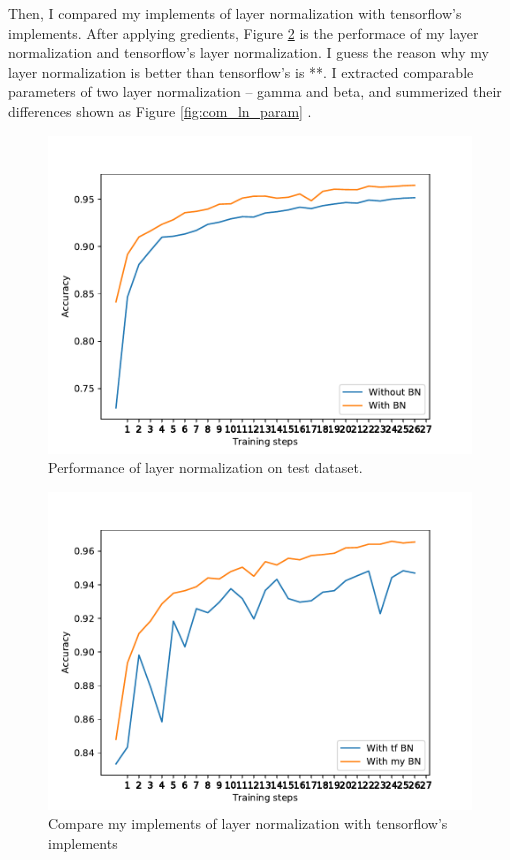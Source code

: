 \documentclass{article}
\begin{document}
Then, I compared my implements of layer normalization with tensorflow's implements. After applying gredients, Figure \ref{fig:com_ln} is the performace of my layer normalization and tensorflow's layer normalization. I guess the reason why my layer normalization is better than tensorflow's is **. I extracted comparable parameters of two layer normalization -- gamma and  beta, and summerized their differences shown as Figure \ref{fig:com_ln_param} .

\begin{figure}[h]
\includegraphics[scale=0.8]{img/ln1.pdf}
\caption{Performance of layer normalization on test dataset.}
\label{fig:ln}
\end{figure}

\begin{figure}[h]
\includegraphics[scale=0.8]{img/com_LN1.pdf}
\caption{Compare my implements of layer normalization with tensorflow's implements}
\label{fig:com_ln}
\end{figure}
\end{document}
